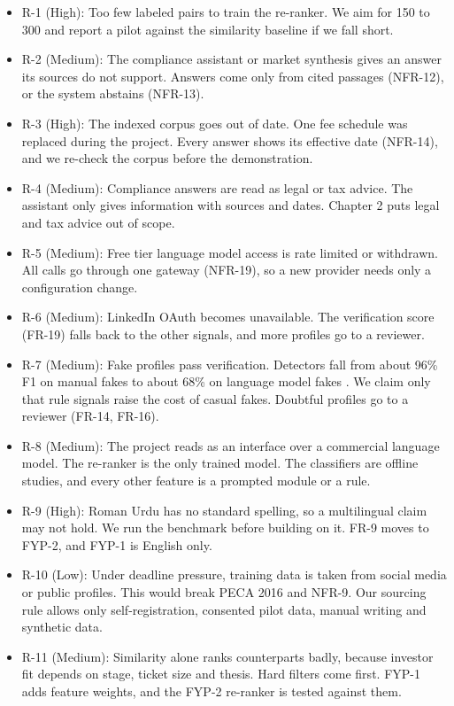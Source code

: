 \documentclass{FastFyp}
\begin{document}
\begin{itemize}
    \item R-1 (High): Too few labeled pairs to train the re-ranker. We aim for 150 to 300 and report a pilot against the similarity baseline if we fall short.
    \item R-2 (Medium): The compliance assistant or market synthesis gives an answer its sources do not support. Answers come only from cited passages (NFR-12), or the system abstains (NFR-13).
    \item R-3 (High): The indexed corpus goes out of date. One fee schedule was replaced during the project. Every answer shows its effective date (NFR-14), and we re-check the corpus before the demonstration.
    \item R-4 (Medium): Compliance answers are read as legal or tax advice. The assistant only gives information with sources and dates. Chapter 2 puts legal and tax advice out of scope.
    \item R-5 (Medium): Free tier language model access is rate limited or withdrawn. All calls go through one gateway (NFR-19), so a new provider needs only a configuration change.
    \item R-6 (Medium): LinkedIn OAuth becomes unavailable. The verification score (FR-19) falls back to the other signals, and more profiles go to a reviewer.
    \item R-7 (Medium): Fake profiles pass verification. Detectors fall from about 96\% F1 on manual fakes to about 68\% on language model fakes \cite{ref:gulati2025}. We claim only that rule signals raise the cost of casual fakes. Doubtful profiles go to a reviewer (FR-14, FR-16).
    \item R-8 (Medium): The project reads as an interface over a commercial language model. The re-ranker is the only trained model. The classifiers are offline studies, and every other feature is a prompted module or a rule.
    \item R-9 (High): Roman Urdu has no standard spelling, so a multilingual claim may not hold. We run the benchmark before building on it. FR-9 moves to FYP-2, and FYP-1 is English only.
    \item R-10 (Low): Under deadline pressure, training data is taken from social media or public profiles. This would break PECA 2016 and NFR-9. Our sourcing rule allows only self-registration, consented pilot data, manual writing and synthetic data.
    \item R-11 (Medium): Similarity alone ranks counterparts badly, because investor fit depends on stage, ticket size and thesis. Hard filters come first. FYP-1 adds feature weights, and the FYP-2 re-ranker is tested against them.

\end{itemize}
\end{document}
